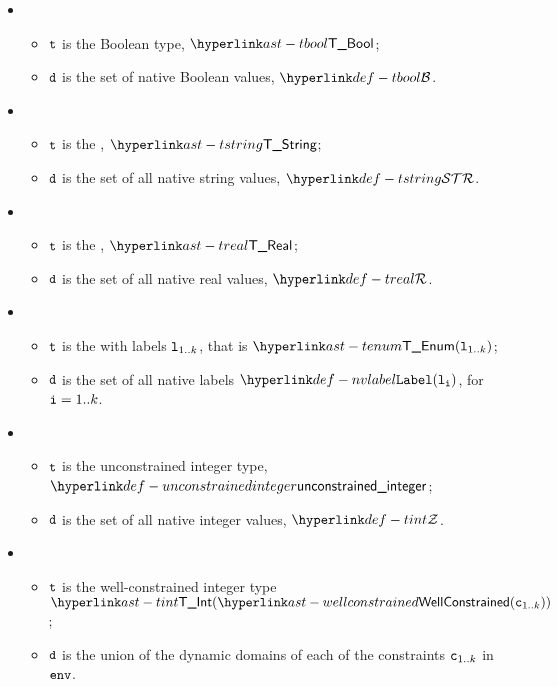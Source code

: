 \ProseParagraph
\OneApplies
\begin{itemize}
  \item {}
  \begin{itemize}
    \item $\texttt{t}$ is the Boolean type, $\TBool$;
    \item $\texttt{d}$ is the set of native Boolean values, $\tbool$.
  \end{itemize}

  \item {}
  \begin{itemize}
    \item $\texttt{t}$ is the \stringtypeterm{}, $\TString$;
    \item $\texttt{d}$ is the set of all native string values, $\tstring$.
  \end{itemize}

  \item {}
  \begin{itemize}
    \item $\texttt{t}$ is the \realtypeterm{}, $\TReal$;
    \item $\texttt{d}$ is the set of all native real values, $\treal$.
  \end{itemize}

  \item {}
  \begin{itemize}
    \item $\texttt{t}$ is the \enumerationtypeterm{} with labels $\texttt{l}_{1..k}$, that is $\TEnum(\vl_{1..k})$;
    \item $\texttt{d}$ is the set of all native labels $\nvlabel(\vl_\vi)$, for $\texttt{i} = 1..k$.
  \end{itemize}

  \item {}
  \begin{itemize}
    \item $\texttt{t}$ is the unconstrained integer type, $\unconstrainedinteger$;
    \item $\texttt{d}$ is the set of all native integer values, $\tint$.
  \end{itemize}

  \item {}
  \begin{itemize}
    \item $\texttt{t}$ is the well-constrained integer type $\TInt(\wellconstrained(\vc_{1..k}))$;
    \item $\texttt{d}$ is the union of the dynamic domains of each of the constraints $\texttt{c}_{1..k}$ in $\texttt{env}$.
  \end{itemize}


\end{itemize}
